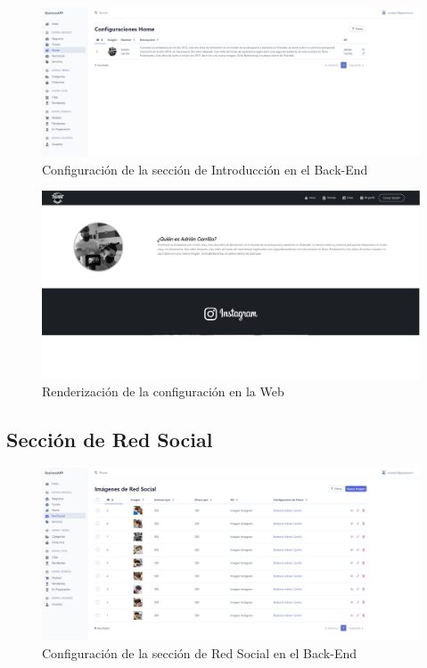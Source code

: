 \begin{figure}[H]
  \centering
  \includegraphics[scale=0.2]{images/back-end-introduction.png}
  \caption{Configuración de la sección de Introducción en el Back-End}
  \label{}
\end{figure}

\begin{figure}[H]
  \centering
  \includegraphics[scale=0.2]{images/front-end-introduction.png}
  \caption{Renderización de la configuración en la Web}
  \label{}
\end{figure}

\subsection{Sección de Red Social}

\begin{figure}[H]
  \centering
  \includegraphics[scale=0.2]{images/back-end-social.png}
  \caption{Configuración de la sección de Red Social en el Back-End}
  \label{}
\end{figure}

